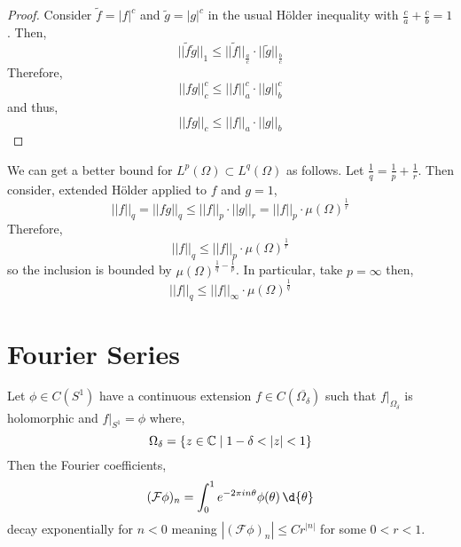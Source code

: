 \documentclass[12pt]{article}
\renewcommand{\F}{\mathcal{F}}
\begin{document}
\begin{proof}
Consider $\tilde{f} = |f|^c$ and $\tilde{g} = |g|^c$ in the usual H\"{o}lder inequality with $\frac{c}{a} + \frac{c}{b} = 1$. Then,
\[ || \tilde{f} \tilde{g} ||_1 \le || \tilde{f} ||_{\frac{a}{c}} \cdot || \tilde{g} ||_{\frac{b}{c}} \]
Therefore,
\[ || fg ||_c^c \le || f ||_a^{c} \cdot || g ||_b^{c} \]
and thus,
\[ || fg ||_c \le || f ||_a \cdot || g ||_b \]
\end{proof}

\begin{rmk}
We can get  a better bound for $L^p(\Omega) \subset L^q(\Omega)$ as follows. Let $\frac{1}{q} = \frac{1}{p} + \frac{1}{r}$. Then consider, extended H\"{o}lder applied to $f$ and $g = 1$,
\[ || f ||_q = || fg ||_q \le || f ||_p \cdot || g ||_r = || f ||_p \cdot \mu(\Omega)^{\frac{1}{r}} \]
Therefore,
\[ || f ||_q  \le || f ||_p \cdot \mu(\Omega)^{\frac{1}{r}} \]
so the inclusion is bounded by $\mu(\Omega)^{\frac{1}{q} - \frac{1}{p}}$. In particular, take $p = \infty$ then,
\[ || f ||_q \le || f ||_\infty \cdot \mu(\Omega)^{\frac{1}{q}} \]
\end{rmk}

\section{Fourier Series}

\begin{prop}
Let $\phi \in C(S^1)$ have a continuous extension $f \in C(\overline{\Omega_\delta})$ such that $f|_{\Omega_\delta}$ is holomorphic and $f|_{S^1} = \phi$ where,
\[ \Omega_\delta = \{ z \in \mathbb{C} \mid 1 - \delta < | z | < 1 \} \]
Then the Fourier coefficients,
\[ (\F \phi)_n = \int_0^1 e^{- 2 \pi i n \theta} \phi(\theta) \, \d{\theta} \]
decay exponentially for $n < 0$ meaning $| (\F \phi)_n | \le C r^{|n|}$ for some $0 < r < 1$.
\end{prop}
\end{document}
